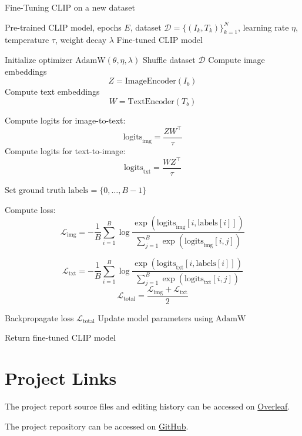 \documentclass{article}
\begin{document}
\begin{algorithm}[h!]
\caption{Fine-Tuning CLIP on a new dataset}
\begin{algorithmic}[1]
\Require Pre-trained CLIP model, epochs \(E\), dataset \( \mathcal{D} = \{(I_k, T_k)\}_{k=1}^N \), learning rate \(\eta\), 
    temperature \(\tau\), weight decay \( \lambda \)
\Ensure Fine-tuned CLIP model

\State Initialize optimizer \( \text{AdamW}(\theta, \eta, \lambda) \)
    \State Shuffle dataset \( \mathcal{D} \)
        \State Compute image embeddings \[ Z = \text{ImageEncoder}(I_b) \]
        \State Compute text embeddings \[ W = \text{TextEncoder}(T_b) \]
        
        \State Compute logits for image-to-text: 
        \[
        \text{logits}_{\text{img}} = \frac{Z W^\top}{\tau}
        \]
        \State Compute logits for text-to-image:
        \[
        \text{logits}_{\text{txt}} = \frac{W Z^\top}{\tau}
        \]
        
        \State Set ground truth \( \text{labels} = \{0, \dots, B-1\} \)
        
        \State Compute loss:
        \[
        \mathcal{L}_{\text{img}} = -\frac{1}{B} \sum_{i=1}^B \log \frac{\exp(\text{logits}_{\text{img}}[i, \text{labels}[i]])}{\sum_{j=1}^B \exp(\text{logits}_{\text{img}}[i, j])}
        \]


        \[
        \mathcal{L}_{\text{txt}} = -\frac{1}{B} \sum_{i=1}^B \log \frac{\exp(\text{logits}_{\text{txt}}[i, \text{labels}[i]])}{\sum_{j=1}^B \exp(\text{logits}_{\text{txt}}[i, j])}
        \]
        \[
        \mathcal{L}_{\text{total}} = \frac{\mathcal{L}_{\text{img}} + \mathcal{L}_{\text{txt}}}{2}
        \]
        
        \State Backpropagate loss \( \mathcal{L}_{\text{total}} \)
        \State Update model parameters using \( \text{AdamW} \)
    \EndFor
\EndFor

\State Return fine-tuned CLIP model
\end{algorithmic}
\label{alg:fine-tune}
\end{algorithm}

\section{Project Links}
The project report source files and editing history can be accessed on \href{https://sharelatex.tum.de/project/674fad5f337a99e91b997e9c}{Overleaf}. 

The project repository can be accessed on \href{https://github.com/matteomrz/20242R0136COSE47402/tree/792bd2620450ef04677d07a3e92b6c742aed11cd/final}{GitHub}.

\clearpage
\end{document}

